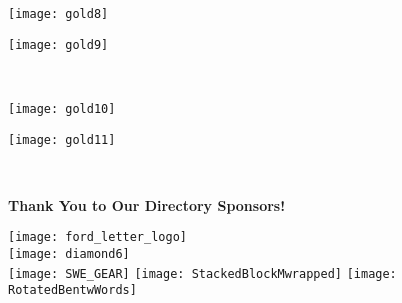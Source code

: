 \documentclass[twoside]{article}
\begin{document}
\begin{center}
        \hspace{1em}\begin{minipage}{0.3\textwidth}\begin{center}\texttt{[image: gold8]}\vfill\end{center}\end{minipage}
        \hspace{1em}\begin{minipage}{0.3\textwidth}\begin{center}\texttt{[image: gold9]}\vfill\end{center}\end{minipage}
        \\
            \begin{minipage}{0.3\textwidth}\begin{center}\texttt{[image: gold10]}\vfill\end{center}\end{minipage}
        \hspace{1em}\begin{minipage}{0.3\textwidth}\begin{center}\texttt{[image: gold11]}\vfill\end{center}\end{minipage}
        \\
            \end{center}
    \newpage
    \backcover
    { \fontsize{16}{19}\selectfont \bf Thank You to Our Directory Sponsors!}\\
    \begin{center}
    \vfill
    \texttt{[image: ford\_letter\_logo]}\\[3em]
        \texttt{[image: diamond6]}\\[3em]
        \vfill
    \texttt{[image: SWE\_GEAR]}\hspace{3em}
    \texttt{[image: StackedBlockMwrapped]}\hspace{3em}
    \texttt{[image: RotatedBentwWords]}
    \end{center}
    
\end{document}
